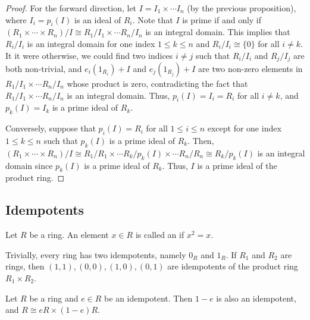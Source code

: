 \begin{proof}
    For the forward direction, let $I = I_{1} \times \cdots I_{n}$ (by the previous proposition), where $I_{i} = p_{i}(I)$ is an ideal of $R_{i}$. Note that $I$ is prime if and only if $(R_{1} \times \cdots \times R_{n})/I \cong R_{1}/I_{1} \times \cdots R_{n}/I_{n}$ is an integral domain. This implies that $R_{i}/I_{i}$ is an integral domain for one index $1 \leq k \leq n$ and $R_{i}/I_{i} \cong \{0\}$ for all $i \neq k$. It it were otherwise, we could find two indices $i \neq j$ such that $R_{i}/I_{i}$ and $R_{j}/I_{j}$ are both non-trivial, and $e_{i}(1_{R_{i}}) + I$ and $e_{j}(1_{R_{j}}) + I$ are two non-zero elements in $R_{1}/I_{1} \times \cdots R_{n}/I_{n}$ whose product is zero, contradicting the fact that $R_{1}/I_{1} \times \cdots R_{n}/I_{n}$ is an integral domain. Thus, $p_{i}(I) = I_{i} = R_{i}$ for all $i \neq k$, and $p_{k}(I) = I_{k}$ is a prime ideal of $R_{k}$.

    Conversely, suppose that $p_{i}(I) = R_{i}$ for all $1 \leq i \leq n$ except for one index $1 \leq k \leq n$ such that $p_{k}(I)$ is a prime ideal of $R_{k}$. Then, $(R_{1} \times \cdots \times R_{n})/I \cong R_{1}/R_{1} \times \cdots R_{k}/p_{k}(I) \times \cdots R_{n}/R_{n} \cong R_{k}/p_{k}(I)$ is an integral domain since $p_{k}(I)$ is a prime ideal of $R_{k}$. Thus, $I$ is a prime ideal of the product ring.
\end{proof}

\subsection{Idempotents}

\begin{definition}
    Let $R$ be a ring. An element $x \in R$ is called an  if $x^{2} = x$.
\end{definition}

\begin{example}
    Trivially, every ring has two idempotents, namely $0_{R}$ and $1_{R}$. If $R_{1}$ and $R_{2}$ are rings, then $(1,1),(0,0),(1,0),(0,1)$ are idempotents of the product ring $R_{1} \times R_{2}$.
\end{example}

\begin{proposition}
    Let $R$ be a ring and $e \in R$ be an idempotent. Then $1-e$ is also an idempotent, and $R \cong eR \times (1-e)R$.
\end{proposition}


